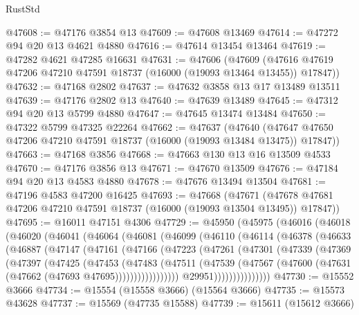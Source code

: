 \begin{lexlean}{RustStd}
\begin{coremodule}
@47608 := @47176 @3854 @13
@47609 := @47608 @13469
@47614 := @47272 @94 @20 @13 @4621 @4880
@47616 := @47614 @13454 @13464
@47619 := @47282 @4621 @47285 @16631
@47631 := @47606
    (@47609 (@47616 @47619 @47206 @47210 @47591 @18737 (@16000 (@19093 @13464 @13455)) @17847))
@47632 := @47168 @2802
@47637 := @47632 @3858 @13 @17 @13489 @13511
@47639 := @47176 @2802 @13
@47640 := @47639 @13489
@47645 := @47312 @94 @20 @13 @5799 @4880
@47647 := @47645 @13474 @13484
@47650 := @47322 @5799 @47325 @22264
@47662 := @47637
    (@47640 (@47647 @47650 @47206 @47210 @47591 @18737 (@16000 (@19093 @13484 @13475)) @17847))
@47663 := @47168 @3856
@47668 := @47663 @130 @13 @16 @13509 @4533
@47670 := @47176 @3856 @13
@47671 := @47670 @13509
@47676 := @47184 @94 @20 @13 @4583 @4880
@47678 := @47676 @13494 @13504
@47681 := @47196 @4583 @47200 @16425
@47693 := @47668
    (@47671 (@47678 @47681 @47206 @47210 @47591 @18737 (@16000 (@19093 @13504 @13495)) @17847))
@47695 := @16011 @47151 @4306
@47729 := @45950
    (@45975
      (@46016
        (@46018
          (@46020
            (@46041
              (@46064
                (@46081
                  (@46099
                    (@46110
                      (@46114
                        (@46378
                          (@46633
                            (@46887
                              (@47147
                                (@47161
                                  (@47166
                                    (@47223
                                      (@47261
                                        (@47301
                                          (@47339
                                            (@47369
                                              (@47397
                                                (@47425
                                                  (@47453
                                                    (@47483
                                                      (@47511
                                                        (@47539
                                                          (@47567
                                                            (@47600
                                                              (@47631
                                                                (@47662
                                                                  (@47693 @47695)))))))))))))))))
                                  @29951)))))))))))))))
@47730 := @15552 @3666
@47734 := @15554 (@15558 @3666) (@15564 @3666)
@47735 := @15573 @43628
@47737 := @15569 (@47735 @15588)
@47739 := @15611 (@15612 @3666)

\end{coremodule}
\end{lexlean}
